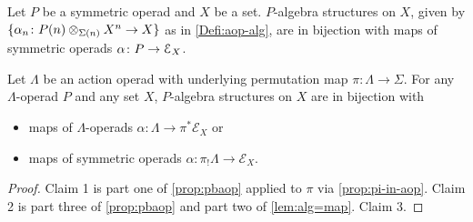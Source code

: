 

\begin{lem}\label{lem:alg=map}
 Let $P$ be a symmetric operad and $X$ be a set. $P$-algebra structures on $X$, given by $\{ \alpha_n \colon  P(n) \otimes_{\Sigma(n)} X^{n} \rightarrow X\}$ as in \cref{Defi:aop-alg}, are in bijection with maps of symmetric operads $\alpha \colon P \to \mathcal{E}_X$.
\end{lem}

\begin{cor}\label{cor:pi-star}
Let $\Lambda$ be an action operad with underlying permutation map $\pi \colon \Lambda \to \Sigma$. 
 For any $\Lambda$-operad $P$ and any set $X$, $P$-algebra structures on $X$ are in bijection with 
\begin{itemize}
\item maps of $\Lambda$-operads $\alpha \colon \Lambda \to \pi^* \mathcal{E}_X$ or
\item maps of symmetric operads $\alpha \colon \pi_{!}\Lambda \to  \mathcal{E}_X$.
\end{itemize}
\end{cor}
\begin{proof}
Claim 1 is part one of \cref{prop:pbaop} applied to $\pi$ via \cref{prop:pi-in-aop}.
Claim 2 is part three of \cref{prop:pbaop} and part two of \cref{lem:alg=map}.
Claim 3.
\end{proof}

\begin{rem}\label{rem:sym-vs-lam}
\end{rem}

